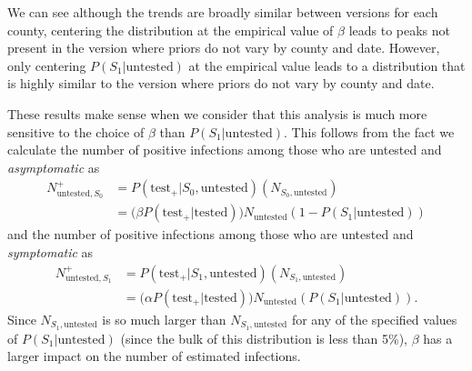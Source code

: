 \documentclass[12pt,twoside]{smiththesis}
\begin{document}
We can see although the trends are broadly similar between versions for each county, centering the distribution at the empirical value of \(\beta\) leads to peaks not present in the version where priors do not vary by county and date. However, only centering \(P(S_1|\text{untested})\) at the empirical value leads to a distribution that is highly similar to the version where priors do not vary by county and date.

These results make sense when we consider that this analysis is much more sensitive to the choice of \(\beta\) than \(P(S_1|\text{untested})\). This follows from the fact we calculate the number of positive infections among those who are untested and \emph{asymptomatic} as
\begin{align*}
N^+_{\text{untested},S_0} &= P(\text{test}_+| S_0,\text{untested}) (N_{S_0,\text{untested}})\\
&= \Big( \beta P(\text{test}_+ |\text{tested}) \Big) N_{\text{untested}} (1-P(S_1|\text{untested}))
\end{align*}
and the number of positive infections among those who are untested and \emph{symptomatic} as\\
\begin{align*} N^+_{\text{untested},S_1}& = P(\text{test}_+| S_1,\text{untested}) (N_{S_1,\text{untested}})\\
&= \Big( \alpha P(\text{test}_+ |\text{tested}) \Big) N_{\text{untested}} (P(S_1|\text{untested})).
\end{align*}
Since \(N_{S_1, \text{untested}}\) is so much larger than \(N_{S_1, \text{untested}}\) for any of the specified values of \(P(S_1|\text{untested})\) (since the bulk of this distribution is less than 5\%), \(\beta\) has a larger impact on the number of estimated infections.
\end{document}
